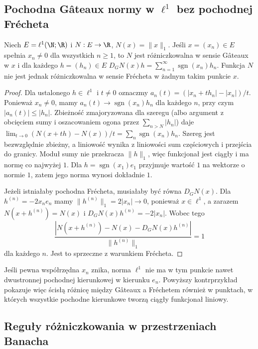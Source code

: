 \subsection{Pochodna Gâteaux normy w \texorpdfstring{$\ell^1$}{ell1} bez pochodnej Frécheta}

\begin{twierdzenie}
\label{thm:l1-gateaux14}
Niech $E=\ell^1(\N;\R)$ i $N:E\to\R$, $N(x)=\|x\|_1$. Jeśli $x=(x_n)\in E$ spełnia $x_n\ne0$ dla wszystkich $n\ge1$, to $N$ jest różniczkowalna w sensie Gâteaux w $x$ i dla każdego $h=(h_n)\in E$
$D_GN(x)h=\sum_{n=1}^\infty \operatorname{sgn}(x_n)h_n$.
Funkcja $N$ nie jest jednak różniczkowalna w sensie Frécheta w żadnym takim punkcie $x$.
\end{twierdzenie}
\begin{proof}
Dla ustalonego $h\in\ell^1$ i $t\ne0$ oznaczmy $a_n(t)=(|x_n+th_n|-|x_n|)/t$. Ponieważ $x_n\ne0$, mamy $a_n(t)\to\operatorname{sgn}(x_n)h_n$ dla każdego $n$, przy czym $|a_n(t)|\le|h_n|$. Zbieżność zmajoryzowana dla szeregu (albo argument z obcięciem sumy i oszacowaniem ogona przez $\sum_{n>N}|h_n|$) daje
$\lim_{t\to0}(N(x+th)-N(x))/t=\sum_n \operatorname{sgn}(x_n)h_n$.
Szereg jest bezwzględnie zbieżny, a liniowość wynika z liniowości sum częściowych i przejścia do granicy. Moduł sumy nie przekracza $\|h\|_1$, więc funkcjonał jest ciągły i ma normę co najwyżej $1$. Dla $h=\operatorname{sgn}(x_1)e_1$ przyjmuje wartość $1$ na wektorze o normie $1$, zatem jego norma wynosi dokładnie $1$.

Jeżeli istniałaby pochodna Frécheta, musiałaby być równa $D_GN(x)$. Dla $h^{(n)}=-2x_ne_n$ mamy $\|h^{(n)}\|_1=2|x_n|\to0$, ponieważ $x\in\ell^1$, a zarazem $N(x+h^{(n)})=N(x)$ i $D_GN(x)h^{(n)}=-2|x_n|$. Wobec tego
\[
\frac{|N(x+h^{(n)})-N(x)-D_GN(x)h^{(n)}|}{\|h^{(n)}\|_1}=1
\]
dla każdego $n$. Jest to sprzeczne z warunkiem Frécheta.
\end{proof}

\begin{uwaga}
Jeśli pewna współrzędna $x_n$ znika, norma $\ell^1$ nie ma w tym punkcie nawet dwustronnej pochodnej kierunkowej w kierunku $e_n$. Powyższy kontrprzykład pokazuje więc ścisłą różnicę między Gâteaux a Fréchetem również w punktach, w których wszystkie pochodne kierunkowe tworzą ciągły funkcjonał liniowy.
\end{uwaga}

\subsection{Reguły różniczkowania w przestrzeniach Banacha}

